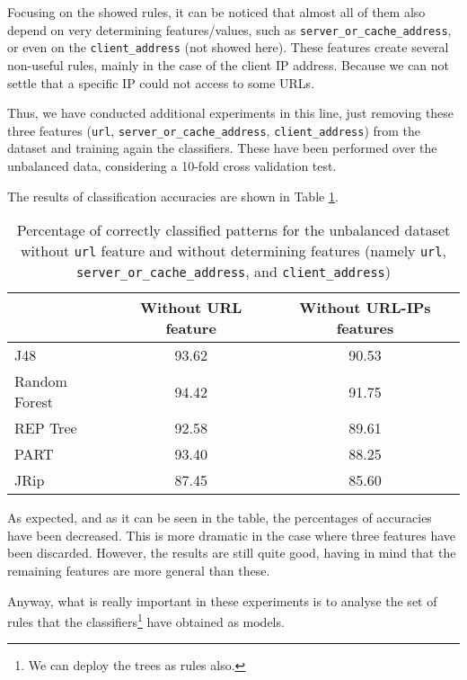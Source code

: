 \documentclass{llncs}
\begin{document}
Focusing on the showed rules, it can be noticed that almost all of them also depend on very determining features/values, such as \texttt{server\_or\_cache\_address}, or even on the \texttt{client\_address} (not showed here).
These features create several non-useful rules, mainly in the case of the client IP address. Because we can not settle that a specific IP could not access to some URLs.

Thus, we have conducted additional experiments in this line, just removing these three features (\texttt{url}, \texttt{server\_or\_cache\_address}, \texttt{client\_address}) from the dataset and training again the classifiers.
These have been performed over the unbalanced data, considering a 10-fold cross validation test.

The results of classification accuracies are shown in Table \ref{tab_rules_study_classification}.

\begin{table}[htpb]
\centering
 \caption{\label{tab_rules_study_classification} Percentage of correctly classified patterns for the unbalanced dataset without \texttt{url} feature and without determining features (namely \texttt{url}, \texttt{server\_or\_cache\_address}, and \texttt{client\_address})}
{\small
\begin{tabular}{|l|c|c|}
\cline{2-3}
\multicolumn{1}{l|}{} & Without URL feature & Without URL-IPs features\\ 
\hline
J48 & 93.62 & 90.53 \\ 
\cline{1-1}
Random Forest & 94.42 & 91.75 \\
\cline{1-1}
REP Tree & 92.58 & 89.61 \\ 
\cline{1-1}
PART & 93.40 & 88.25 \\ 
\cline{1-1}
JRip & 87.45 & 85.60 \\ 
\hline
\end{tabular}
}
\end{table}


As expected, and as it can be seen in the table, the percentages of accuracies have been decreased. This is more dramatic in the case where three features have been discarded.
However, the results are still quite good, having in mind that the remaining features are more general than these.

Anyway, what is really important in these experiments is to analyse the set of rules that the classifiers\footnote{We can deploy the trees as rules also.} have obtained as models.
\end{document}
